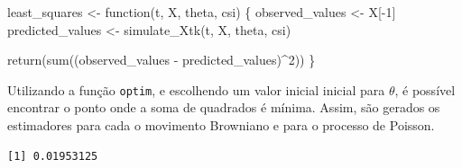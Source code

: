 \documentclass[
  letterpaper,
  DIV=11,
  numbers=noendperiod]{scrreprt}
\newenvironment{Shaded}{\begin{snugshade}}{\end{snugshade}}
\newcommand{\AttributeTok}[1]{\textcolor[rgb]{0.40,0.45,0.13}{#1}}
\newcommand{\ControlFlowTok}[1]{\textcolor[rgb]{0.00,0.23,0.31}{#1}}
\newcommand{\DecValTok}[1]{\textcolor[rgb]{0.68,0.00,0.00}{#1}}
\newcommand{\DocumentationTok}[1]{\textcolor[rgb]{0.37,0.37,0.37}{\textit{#1}}}
\newcommand{\FunctionTok}[1]{\textcolor[rgb]{0.28,0.35,0.67}{#1}}
\newcommand{\NormalTok}[1]{\textcolor[rgb]{0.00,0.23,0.31}{#1}}
\newcommand{\OtherTok}[1]{\textcolor[rgb]{0.00,0.23,0.31}{#1}}
\newcommand{\SpecialCharTok}[1]{\textcolor[rgb]{0.37,0.37,0.37}{#1}}
\begin{document}
\begin{Shaded}
\begin{Highlighting}[]
\NormalTok{least\_squares }\OtherTok{\textless{}{-}} \ControlFlowTok{function}\NormalTok{(t, X, theta, csi) \{}
\NormalTok{    observed\_values }\OtherTok{\textless{}{-}}\NormalTok{ X[}\SpecialCharTok{{-}}\DecValTok{1}\NormalTok{]}
\NormalTok{    predicted\_values }\OtherTok{\textless{}{-}} \FunctionTok{simulate\_Xtk}\NormalTok{(t, X, theta, csi)}

    \FunctionTok{return}\NormalTok{(}\FunctionTok{sum}\NormalTok{((observed\_values }\SpecialCharTok{{-}}\NormalTok{ predicted\_values)}\SpecialCharTok{\^{}}\DecValTok{2}\NormalTok{))}
\NormalTok{\}}
\end{Highlighting}
\end{Shaded}

Utilizando a função \texttt{optim}, e escolhendo um valor inicial
inicial para \(\theta\), é possível encontrar o ponto onde a soma de
quadrados é mínima. Assim, são gerados os estimadores para cada o
movimento Browniano e para o processo de Poisson.

\begin{Shaded}
\end{Shaded}

\begin{verbatim}
[1] 0.01953125
\end{verbatim}

\begin{Shaded}
\end{Shaded}
\end{document}
